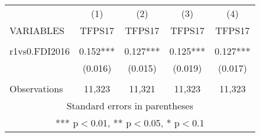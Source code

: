 \documentclass[]{article}
\begin{document}
\begin{tabular}{lcccc} \hline
 & (1) & (2) & (3) & (4) \\
VARIABLES & TFPS17 & TFPS17 & TFPS17 & TFPS17 \\ \hline
 &  &  &  &  \\
r1vs0.FDI2016 & 0.152*** & 0.127*** & 0.125*** & 0.127*** \\
 & (0.016) & (0.015) & (0.019) & (0.017) \\
 &  &  &  &  \\
 Observations & 11,323 & 11,321 & 11,323 & 11,323 \\ \hline
\multicolumn{5}{c}{ Standard errors in parentheses} \\
\multicolumn{5}{c}{ *** p$<$0.01, ** p$<$0.05, * p$<$0.1} \\
\end{tabular}
\end{document}
